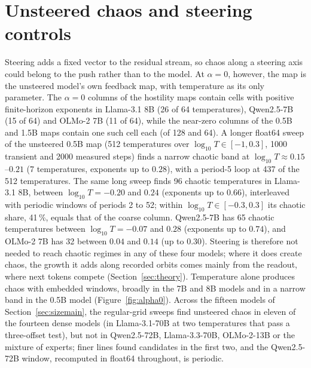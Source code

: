 \documentclass[11pt,letterpaper]{article}
\begin{document}
\section{Unsteered chaos and steering controls}
\label{sec:origin}
Steering adds a fixed vector to the residual stream, so chaos along
a steering axis could belong to the push rather than to the model. At $\alpha=0$, however, the map is the unsteered
model's own feedback map, with temperature as its only parameter. The $\alpha=0$ columns of the hostility maps contain
cells with positive finite-horizon exponents in Llama-3.1 8B (26 of 64 temperatures), Qwen2.5-7B (15 of 64) and
OLMo-2 7B (11 of 64), while the near-zero columns of the 0.5B and 1.5B maps contain one such cell each (of 128 and
64). A longer float64 sweep of the unsteered 0.5B map (512 temperatures over $\log_{10}T\in[-1,0.3]$, 1000 transient
and 2000 measured steps) finds a narrow chaotic band at $\log_{10}T\approx0.15$--$0.21$ (7 temperatures, exponents up
to $0.28$), with a period-5 loop at 437 of the 512 temperatures. The same long sweep finds 96 chaotic temperatures in
Llama-3.1 8B, between $\log_{10}T=-0.20$ and $0.24$ (exponents up to $0.66$), interleaved with periodic windows of
periods 2 to 52; within $\log_{10}T\in[-0.3,0.3]$ its chaotic share, 41\,\%, equals that of the coarse column.
Qwen2.5-7B has 65 chaotic temperatures between $\log_{10}T=-0.07$ and $0.28$ (exponents up to $0.74$), and OLMo-2 7B
has 32 between $0.04$ and $0.14$ (up to $0.30$). Steering is therefore not needed to reach chaotic regimes in any of
these four models; where it does create chaos, the growth it adds along recorded orbits comes mainly from the readout, where next
tokens compete (Section~\ref{sec:theory}). Temperature alone produces chaos with embedded windows, broadly in the 7B and 8B models and in
a narrow band in the 0.5B model (Figure~\ref{fig:alpha0}). Across the fifteen models of Section~\ref{sec:sizemain}, the
regular-grid sweeps find unsteered chaos in eleven of the fourteen dense models (in Llama-3.1-70B at two
temperatures that pass a three-offset test), but not in Qwen2.5-72B, Llama-3.3-70B, OLMo-2-13B or the mixture of
experts; finer lines found candidates in the first two, and the Qwen2.5-72B window, recomputed in float64
throughout, is periodic.
\end{document}
